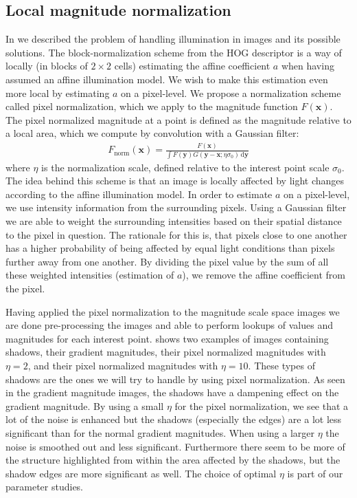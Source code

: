 \documentclass[thesis.tex]{subfiles}
\def\x{\mathbf{x}}
\def\y{\mathbf{y}}
\begin{document}
\subsection{Local magnitude normalization}
\label{sec:localMagnitudeNormalization}
%
In  we described the problem of handling illumination in images and its possible solutions. The block-normalization scheme from the HOG descriptor \cite{dalal2005histograms} is a way of locally (in blocks of $2 \times 2$ cells) estimating the affine coefficient $a$ when having assumed an affine illumination model. We wish to make this estimation even more local by estimating $a$ on a pixel-level. We propose a normalization scheme called pixel normalization, which we apply to the magnitude function $F(\x)$.
The pixel normalized magnitude at a point is defined as the magnitude relative to a local area, which we compute by convolution with a Gaussian filter:
%
\begin{align}
F_\text{norm}(\x) = \frac{F(\x)}{\int F(\y) G(\y - \x; \eta \sigma_0) \,\text{d} \y}
\end{align}
%
where $\eta$ is the normalization scale, defined relative to the interest point scale $\sigma_0$. The idea behind this scheme is that an image is locally affected by light changes according to the affine illumination model. In order to estimate $a$ on a pixel-level, we use intensity information from the surrounding pixels. Using a Gaussian filter we are able to weight the surrounding intensities based on their spatial distance to the pixel in question. The rationale for this is, that pixels close to one another has a higher probability of being affected by equal light conditions than pixels further away from one another. By dividing the pixel value by the sum of all these weighted intensities (estimation of $a$), we remove the affine coefficient from the pixel.

Having applied the pixel normalization to the magnitude scale space images we are done pre-processing the images and able to perform lookups of values and magnitudes for each interest point.
 shows two examples of images containing shadows, their gradient magnitudes, their pixel normalized magnitudes with $\eta = 2$, and their pixel normalized magnitudes with $\eta = 10$. These types of shadows are the ones we will try to handle by using pixel normalization. As seen in the gradient magnitude images, the shadows have a dampening effect on the gradient magnitude. By using a small $\eta$ for the pixel normalization, we see that a lot of the noise is enhanced but the shadows (especially the edges) are a lot less significant than for the normal gradient magnitudes. When using a larger $\eta$ the noise is smoothed out and less significant. Furthermore there seem to be more of the structure highlighted from within the area affected by the shadows, but the shadow edges are more significant as well. The choice of optimal $\eta$ is part of our parameter studies.
\end{document}

